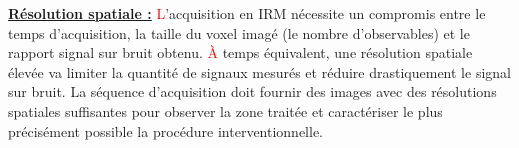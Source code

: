 \underline{\textbf{Résolution spatiale :}} \textcolor{red}{L}’acquisition en IRM nécessite un compromis entre le temps d’acquisition, la taille du voxel imagé (le nombre d’observables) et le rapport signal sur bruit obtenu. \textcolor{red}{À} temps équivalent, une résolution spatiale élevée va limiter la quantité de signaux mesurés et réduire drastiquement le signal sur bruit. La séquence d’acquisition doit fournir des images avec des résolutions spatiales suffisantes pour observer la zone traitée et caractériser le plus précisément possible la procédure interventionnelle.